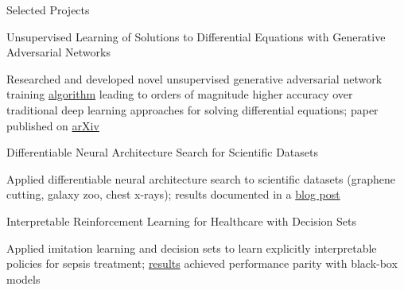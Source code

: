 \documentclass{resume} %
\begin{document}
\begin{rSection}{Selected Projects}

\begin{rSubsection}{Unsupervised Learning of Solutions to Differential Equations with Generative Adversarial Networks}{}{}{}
	\item Researched and developed novel unsupervised generative adversarial network training \href{https://dylanrandle.github.io/denn/deqgan.html}{algorithm} leading to orders of magnitude higher accuracy over traditional deep learning approaches for solving differential equations; paper published on \href{https://arxiv.org/abs/2007.11133}{arXiv}
\end{rSubsection}
\begin{rSubsection}{Differentiable Neural Architecture Search for Scientific Datasets}{}{}{}
	\item Applied differentiable neural architecture search to scientific datasets (graphene cutting, galaxy zoo, chest x-rays); results documented in a \href{https://towardsdatascience.com/investigating-differentiable-neural-architecture-search-for-scientific-datasets-62899be8714e}{blog post}
\end{rSubsection}
\begin{rSubsection}{Interpretable Reinforcement Learning for Healthcare with Decision Sets}{}{}{}
	\item Applied imitation learning and decision sets to learn explicitly interpretable policies for sepsis treatment; \href{https://dylanrandle.github.io/irl/irl.html}{results} achieved performance parity with black-box models
\end{rSubsection}

\end{rSection}
\end{document}
